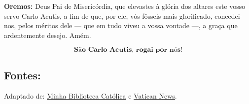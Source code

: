 \documentclass[a4paper,14pt]{extarticle} \usepackage[utf8]{inputenc}
\begin{document}
\textbf{Oremos:} Deus Pai de Misericórdia, que elevastes à glória dos altares este vosso servo Carlo Acutis, a fim de que, por ele, vós fôsseis mais glorificado, concedei-nos, pelos méritos dele — que em tudo viveu a vossa vontade —, a graça que ardentemente desejo. Amém.

\[
  \textbf{São Carlo Acutis, rogai por nós!}
\]

\vfill

\begin{center}
\subsection*{Fontes:}
Adaptado de: \underline{\href{https://bibliotecacatolica.com.br/blog/carlo-acutis/novena-carlo-acutis/}{Minha Biblioteca Católica}} e \underline{\href{https://www.vaticannews.va/pt/papa/news/2025-09/papa-leao-xiv-missa-canonizacao-biografia-acutis.html}{Vatican News}}.
\end{center}
\end{document}
